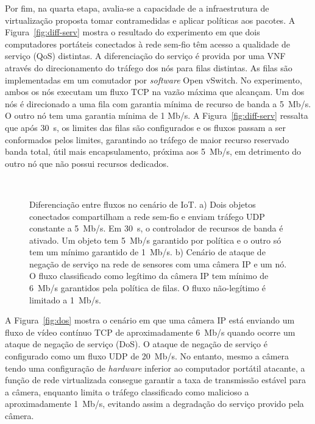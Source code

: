 \documentclass[12pt]{article}
\begin{document}
Por fim, na quarta etapa, avalia-se a capacidade de a infraestrutura de virtualização proposta tomar contramedidas e aplicar políticas aos pacotes. A Figura~\ref{fig:diff-serv} mostra o resultado do experimento em que dois computadores portáteis conectados à rede sem-fio têm acesso a qualidade de serviço (QoS) distintas. A diferenciação do serviço é provida por uma VNF através do direcionamento do tráfego dos nós para filas distintas. As filas são implementadas em um comutador por \textit{software} Open vSwitch. No experimento, ambos os nós executam um fluxo TCP na vazão máxima que alcançam. Um dos nós é direcionado a uma fila com garantia mínima de recurso de banda a 5~Mb/s. O outro nó tem uma garantia mínima de 1 Mb/s. A Figura~\ref{fig:diff-serv} ressalta que após 30~s, os limites das filas são configurados e os fluxos passam a ser conformados pelos limites, garantindo ao tráfego de maior recurso reservado banda total, útil mais encapsulamento, próxima aos 5~Mb/s, em detrimento do outro nó que não possui recursos dedicados. 


\begin{figure*}[tb!]
\begin{center}
\hspace{-3mm}
\mbox{
}
\hspace{-3mm}
\mbox{
}
\end{center}
\vspace{-3mm}
\caption{Diferenciação entre fluxos no cenário de IoT. a) Dois objetos conectados compartilham a rede sem-fio e enviam tráfego UDP constante a 5~Mb/s. Em 30~s, o controlador de recursos de banda é ativado. Um objeto tem 5~Mb/s garantido por política e o outro só tem um mínimo garantido de 1~Mb/s. b) Cenário de ataque de negação de serviço na rede de sensores com uma câmera IP e um nó. O fluxo classificado como legítimo da câmera IP tem mínimo de 6~Mb/s garantidos pela política de filas. O fluxo não-legítimo é limitado a 1~Mb/s.}
\vspace{-3mm}
\end{figure*}

A Figura~\ref{fig:dos} mostra o cenário em que uma câmera IP está enviando um fluxo de vídeo contínuo TCP de aproximadamente 6~Mb/s quando ocorre um ataque de negação de serviço (DoS). O ataque de negação de serviço é configurado como um fluxo UDP de 20~Mb/s. No entanto, mesmo a câmera tendo uma configuração de \textit{hardware} inferior ao computador portátil atacante, a função de rede virtualizada consegue garantir a taxa de transmissão estável para a câmera, enquanto limita o tráfego classificado como malicioso a aproximadamente 1~Mb/s, evitando assim a degradação do serviço provido pela câmera.
\end{document}

